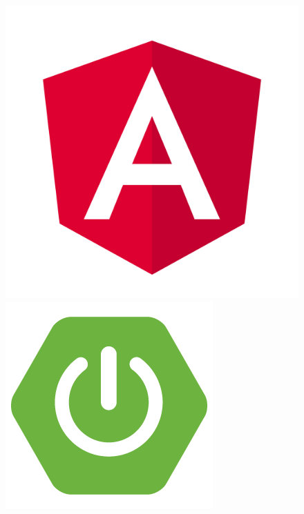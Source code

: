\documentclass[12pt,a4paper]{report}
\begin{document}
\begin{figure}[!htbp]
\centering
\begin{minipage}{0.45\textwidth}
    \centering
    \includegraphics[width=\textwidth]{media/Angular_full_color_logo.svg.png}
\end{minipage}
\hfill
\begin{minipage}{0.45\textwidth}
    \centering
    \includegraphics[width=\textwidth]{media/spring-boot-logo.png}
\end{minipage}


\end{figure}
\end{document}
